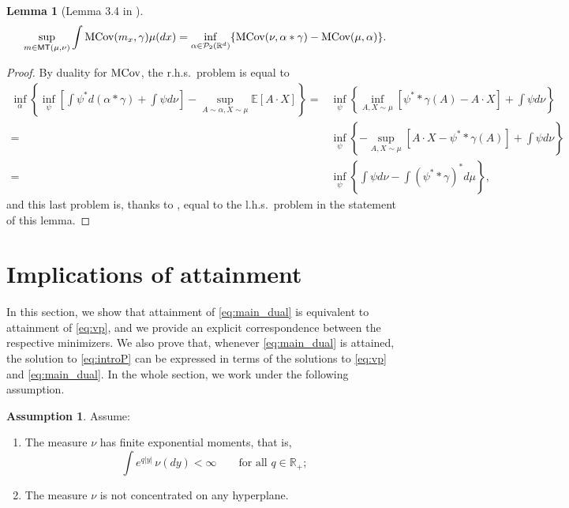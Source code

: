 \documentclass[reqno, a4paper]{amsart}
\theoremstyle{plain}
\newtheorem{lemma}[theorem]{Lemma}
\theoremstyle{definition}
\newtheorem{assumption}[theorem]{Assumption}
\theoremstyle{remark}
\numberwithin{equation}{section}
\numberwithin{theorem}{section}
\newcommand{\R}{\mathbb{R}}
\newcommand{\Rd}{\mathbb{R}^{d}}
\newcommand{\MT}{\mathsf{MT}}
\newcommand{\MCov}{\textnormal{MCov}}
\renewcommand{\P}{\mathcal{P}}
\begin{document}
	\begin{lemma}[Lemma 3.4  in \cite{BaScTs23}]
		$$\sup_{m\in\MT(\mu,\nu)}\int \MCov(m_x,\gamma)\mu(dx)=\inf_{\alpha\in\P_2(\Rd)}\{\MCov(\nu,\alpha\ast\gamma)-\MCov(\mu,\alpha) \} .$$
	\end{lemma}
	
	\begin{proof}
		By duality for $\MCov$, the r.h.s.\ problem is equal to
		\begin{align*}
			\inf_\alpha\left\{ \inf_{\psi}\left [ \int \psi^*d(\alpha\ast\gamma)+\int\psi d\nu  \right ]- \sup_{A\sim\alpha,X\sim\mu}\mathbb E[A\cdot X] \right\} = & \inf_{\psi} \left\{\inf_{A,X\sim\mu}\left[ \psi^\ast\ast\gamma(A)-A\cdot X \right ] + \int\psi d\nu \right\} \\ = & \inf_{\psi} \left\{-\sup_{A,X\sim\mu}\left[ A\cdot X - \psi^\ast\ast\gamma(A)\right ] + \int\psi d\nu \right\} \\ 
			=& \inf_{\psi} \left\{ \int \psi d\nu- \int (\psi^\ast\ast\gamma)^\ast d\mu \right\},
		\end{align*}
		and this last problem is, thanks to \cite{BaBeScTs23}, equal to the l.h.s.\ problem in the statement of this lemma.
	\end{proof}
	
	
	\section{Implications of attainment}
	
	\label{sec:implications}
	
	
	In this section, we show that attainment of \eqref{eq:main_dual} is equivalent to attainment of \eqref{eq:vp}, and we provide an explicit correspondence between the respective minimizers. We also prove that, whenever \eqref{eq:main_dual} is attained, the solution to \eqref{eq:introP} can be expressed in terms of the solutions to \eqref{eq:vp} and \eqref{eq:main_dual}. In the whole section, we work under the following assumption.    
	\begin{assumption}\label{ass:int_nu_hyperplane}
		Assume:
		\begin{enumerate}
			\item[\textnormal{(H1)}] The measure $\nu$ has finite exponential moments, that is, $$\displaystyle \int e^{q |y| }\,\nu(dy)<\infty \qquad \text{for all } q \in \R_+;$$
			\item[\textnormal{(H2)}] The measure $\nu$ is not concentrated on any hyperplane.
		\end{enumerate}
	\end{assumption}
	
\end{document}

